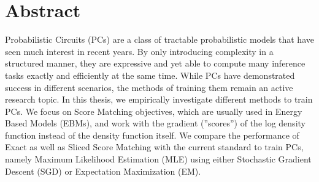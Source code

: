 \chapter{Abstract}

Probabilistic Circuits (PCs) are a class of tractable 
probabilistic models that have seen much interest in recent years. 
By only introducing complexity in a structured manner, they are expressive 
and yet able to compute many inference tasks exactly and efficiently at the same time.
While PCs have demonstrated success in different scenarios, the methods of training them remain an active research topic.
In this thesis, we empirically investigate different methods to train PCs. We focus 
on Score Matching objectives, which are usually used in Energy Based Models (EBMs), 
and work with the gradient (”scores”) of the log density function instead of the density function itself.
We compare the performance of Exact as well as Sliced Score Matching with the
current standard to train PCs, namely Maximum Likelihood Estimation (MLE)
using either Stochastic Gradient Descent (SGD) or Expectation Maximization (EM).
